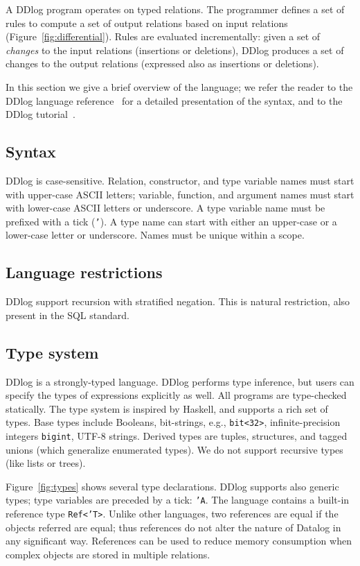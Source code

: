 A DDlog program operates on typed relations.  The programmer defines a
set of rules to compute a set of output relations based on input
relations (Figure~\ref{fig:differential}).  Rules are evaluated
incrementally: given a set of \emph{changes} to the input relations
(insertions or deletions), DDlog produces a set of changes to the
output relations (expressed also as insertions or deletions).

In this section we give a brief overview of the language; we refer the
reader to the DDlog language reference~\cite{ddlog-manual} for a
detailed presentation of the syntax, and to the DDlog
tutorial~\cite{ddlog-tutorial}.

\subsection{Syntax}

DDlog is case-sensitive.  Relation, constructor, and type variable
names must start with upper-case ASCII letters; variable, function,
and argument names must start with lower-case ASCII letters or
underscore.  A type variable name must be prefixed with a tick
(\texttt{'}). A type name can start with either an upper-case or a
lower-case letter or underscore.  Names must be unique within a scope.

\subsection{Language restrictions}

DDlog support recursion with stratified negation.  This is natural
restriction, also present in the SQL standard.

\subsection{Type system}

DDlog is a strongly-typed language.  DDlog performs type inference,
but users can specify the types of expressions explicitly as well.
All programs are type-checked statically.  The type system is inspired
by Haskell, and supports a rich set of types.  Base types include
Booleans, bit-strings, e.g., \texttt{bit<32>}, infinite-precision
integers \texttt{bigint}, UTF-8 strings.  Derived types are tuples,
structures, and tagged unions (which generalize enumerated types).  We
do not support recursive types (like lists or trees).

Figure~\ref{fig:types} shows several type declarations.  DDlog
supports also generic types; type variables are preceded by a tick:
\texttt{'A}.  The language contains a built-in reference type
\texttt{Ref<'T>}.  Unlike other languages, two references are equal if
the objects referred are equal; thus references do not alter the
nature of Datalog in any significant way.  References can be used to
reduce memory consumption when complex objects are stored in multiple
relations.

